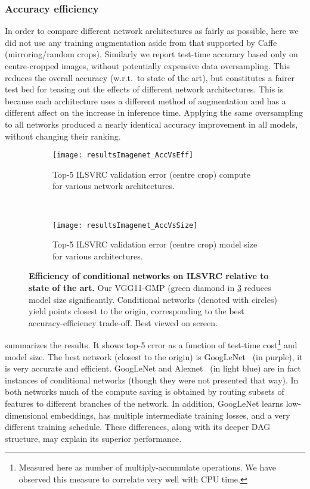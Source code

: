 \documentclass[thesis]{subfiles}
\begin{document}
	\subsubsection{Accuracy \vs{}efficiency}
	In order to compare different network architectures as fairly as possible, here we did not use any training
	augmentation aside from that supported by Caffe~\citep{Jia2014} (mirroring/random crops). Similarly we report test-time 
	accuracy based only on centre-cropped images, without potentially expensive data oversampling. 
	This reduces the overall accuracy (w.r.t.\ to state of the art), but constitutes a fairer test bed for teasing out the effects of different network architectures. This is because each architecture uses a different method of augmentation and has a different affect on the increase in inference time.
	Applying the same oversampling to all networks produced a nearly identical accuracy improvement in 
	all models, without changing their ranking.
	
	
	
	\begin{figure}[tbp] 
		\centering
		\begin{subfigure}[b]{0.95\linewidth}
			\centering
			\texttt{[image: resultsImagenet\_AccVsEff]}
			\caption{Top-5 ILSVRC validation error (centre crop) \vs{}compute for various network architectures.}\label{fig:resultsImagenet_AccVsEff}
		\end{subfigure}
		~
		\begin{subfigure}[b]{0.95\linewidth}
			\centering
			\texttt{[image: resultsImagenet\_AccVsSize]}
			\caption{Top-5 ILSVRC validation error (centre crop) \vs{}model size for various architectures.}\label{fig:resultsImagenet_AccVsSize}
		\end{subfigure}
		\caption[Efficiency of conditional networks on ILSVRC relative to state of the art.]{\textbf{Efficiency of conditional networks on ILSVRC relative to state of the art.} Our VGG11-GMP (green diamond in \cref{fig:Imagenet_results} reduces model size significantly. Conditional networks (denoted with circles) yield points closest to the origin, corresponding to the best accuracy-efficiency trade-off. Best viewed on screen.}\label{fig:Imagenet_results}
	\end{figure}
	
	
	 summarizes the results.
	It shows top-5 error as a function of test-time 
	cost\footnote{Measured here as number of multiply-accumulate operations. We have observed this measure 
		to correlate very well with CPU time.} and model size. 
	The best network (closest to the origin) is GoogLeNet~\citep{Szegedy2014going} (in purple), it is very accurate and efficient. 
	GoogLeNet and Alexnet~\citep{Krizhevsky2012} (in light blue) are in fact instances of conditional networks 
	(though they were not presented that way). In both networks much of the compute saving is obtained by routing
	subsets of features to different branches of the network.
	In addition, GoogLeNet learns low-dimensional embeddings, has multiple intermediate training losses, and a very 
	different training schedule. These differences, along with its deeper DAG structure, may explain its superior performance.
	
\end{document}
